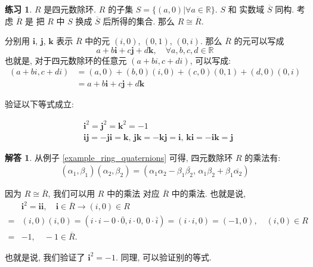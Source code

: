\documentclass[utf8]{ctexbook}
\theoremstyle{definition}
\newtheorem{exercise}{练习}[section]
\newtheorem*{soln}{解答}
\begin{document}
\begin{exercise}
$R$ 是四元数除环. $R$ 的子集 $S = \{ (a, 0) | \forall a \in \mathbb{R} \}$. $S$ 和 实数域 $\overline{S}$ 同构. 考虑 $\overline{R}$ 是 把 $R$ 中 $S$ 换成 $\overline{S}$ 后所得的集合. 那么 $R \cong \overline{R}$. 

分别用 $\mathbf{i}$, $\mathbf{j}$, $\mathbf{k}$ 表示 $\overline{R}$ 中的元 $(i, 0)$, $(0, 1)$, $(0, i)$. 那么 $\overline{R}$ 的元可以写成
\begin{equation}
a + b\mathbf{i} + c\mathbf{j} + d\mathbf{k}, \quad  \forall a, b, c, d \in \mathbb{R}
\end{equation}
也就是, 对于四元数除环的任意元 $(a+bi, c+di)$, 可以写成:
\begin{align*}
(a+bi, c+di) & = (a, 0) + (b,0)(i,0) + (c,0) (0,1) + (d,0)(0,i) \\
& = a + b \mathbf{i} + c \mathbf{j}+ d \mathbf{k}
\end{align*}

验证以下等式成立:

\begin{align*}
& \mathbf{i}^2 = \mathbf{j}^2 = \mathbf{k}^2 = -1 \\
& \mathbf{i} \mathbf{j}  = - \mathbf{j} \mathbf{i}  = \mathbf{k},\, \mathbf{j}  \mathbf{k}  = -\mathbf{k}  \mathbf{j}  = \mathbf{i} ,\, \mathbf{k} \mathbf{i}  = - \mathbf{i}  \mathbf{k}  = \mathbf{j} 
\end{align*}

\end{exercise}

\begin{soln}

从例子 \ref{example_ring_quaternions} 可得, 四元数除环 $R$ 的乘法有:
\begin{align*}
(\alpha_1, \beta_1) (\alpha_2, \beta_2) = ( \alpha_1 \alpha_2 - \beta_1 \overline{\beta_2},\, \alpha_1 \beta_2 + \beta_1 \overline{\alpha_2} )
\end{align*}

因为 $R \cong \overline{R}$, 我们可以用 $R$ 中的乘法 对应 $\overline{R}$ 中的乘法. 也就是说,
\begin{align*}
& \mathbf{i}^2 = \mathbf{i} \mathbf{i} ,\quad \mathbf{i} \in \overline{R} \longrightarrow (i,0) \in R \\
= & (i, 0) (i, 0) = (i \cdot i - 0 \cdot \overline{0}, i \cdot 0, \, 0 \cdot \overline{i}) = (i \cdot i, 0 )  = (-1, 0), \quad (i,0) \in R \\
= & -1 , \quad -1 \in \overline{R} .
\end{align*}

也就是说, 我们验证了 $\mathbf{i}^2 = -1$. 同理, 可以验证别的等式.
\end{soln}
\end{document}
